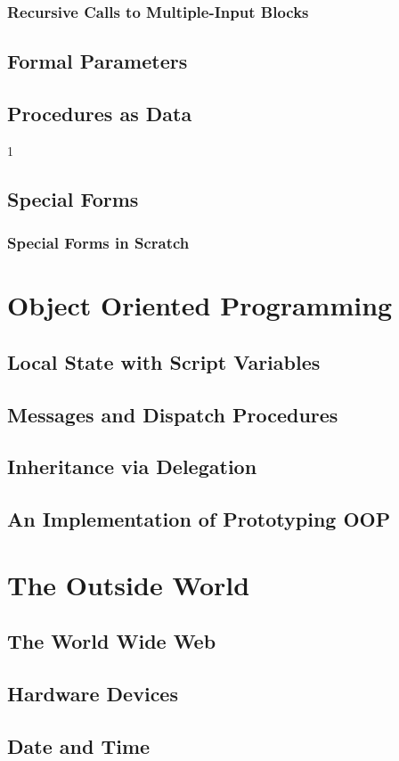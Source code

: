 \documentclass[a4paper]{report}
\begin{document}
\subsection{Recursive Calls to Multiple-Input Blocks}
\section{Formal Parameters}
\section{Procedures as Data}
1\section{Special Forms}
\subsection{Special Forms in Scratch}
\chapter{Object Oriented Programming}
\section{Local State with Script Variables}
\section{Messages and Dispatch Procedures}
\section{Inheritance via Delegation}
\section{An Implementation of Prototyping OOP}
\chapter{The Outside World}
\section{The World Wide Web}
\section{Hardware Devices}
\section{Date and Time}
\end{document}
